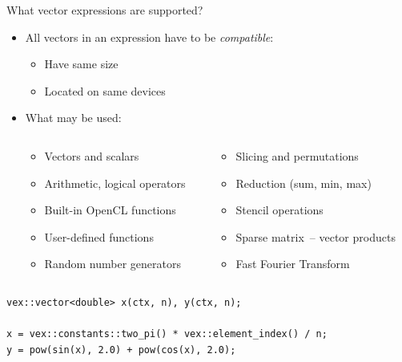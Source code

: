 \documentclass[@BEAMER_OPTIONS@]{beamer}
\begin{document}
\begin{frame}[fragile]{What vector expressions are supported?}
    \begin{itemize}
        \item All vectors in an expression have to be \emph{compatible}:
            \begin{itemize}
                \item Have same size
                \item Located on same devices
            \end{itemize}
        \item What may be used:
            \begin{columns}
                \begin{column}{0.42\textwidth}
                    \begin{itemize}
                        \item Vectors and scalars
                        \item Arithmetic, logical operators
                        \item Built-in OpenCL functions
                        \item User-defined functions
                        \item Random number generators
                    \end{itemize}
                \end{column}
                \begin{column}{0.4\textwidth}
                    \begin{itemize}
                        \item Slicing and permutations
                        \item Reduction (sum, min, max)
                        \item Stencil operations
                        \item Sparse matrix~-- vector products
                        \item Fast Fourier Transform
                    \end{itemize}
                \end{column}
            \end{columns}
    \end{itemize}
    \begin{exampleblock}{}
        \begin{lstlisting}
vex::vector<double> x(ctx, n), y(ctx, n);

x = vex::constants::two_pi() * vex::element_index() / n;
y = pow(sin(x), 2.0) + pow(cos(x), 2.0);
        \end{lstlisting}
    \end{exampleblock}
\end{frame}
\end{document}
